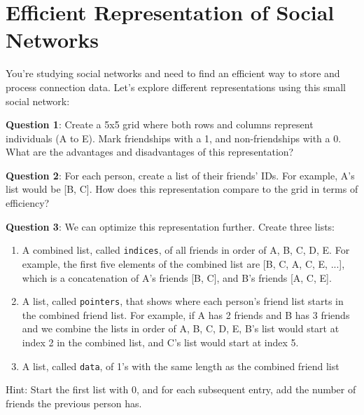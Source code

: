 \documentclass[a4paper, 14pt]{extarticle}
\begin{document}
\section*{\ppfont Efficient Representation of Social Networks}

You're studying social networks and need to find an efficient way to store and process connection data. Let's explore different representations using this small social network:

\begin{center}
\end{center}

{\bf Question 1}:
Create a 5x5 grid where both rows and columns represent individuals (A to E). Mark friendships with a 1, and non-friendships with a 0. What are the advantages and disadvantages of this representation?

\vspace{10em}

{\bf Question 2}:
For each person, create a list of their friends' IDs. For example, A's list would be [B, C]. How does this representation compare to the grid in terms of efficiency?

\vspace{8em}

{\bf Question 3}:
We can optimize this representation further. Create three lists:
\begin{enumerate}
    \item A combined list, called \texttt{indices}, of all friends in order of A, B, C, D, E. For example, the first five elements of the combined list are [B, C, A, C, E, ...], which is a concatenation of A's friends [B, C], and B's friends [A, C, E].
    \item A list, called \texttt{pointers}, that shows where each person's friend list starts in the combined friend list. For example, if A has 2 friends and B has 3 friends and we combine the lists in order of A, B, C, D, E, B's list would start at index 2 in the combined list, and C's list would start at index 5.
    \item A list, called \texttt{data}, of 1's with the same length as the combined friend list
\end{enumerate}
Hint: Start the first list with 0, and for each subsequent entry, add the number of friends the previous person has.
\end{document}
